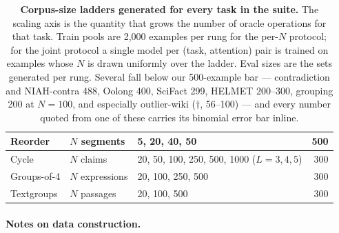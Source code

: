 \begin{table}[h]
\begin{tabular}{@{}l l l r@{}}
Reorder            & $N$ segments       & 5, 20, 40, 50                   & 500 \\
\midrule
Cycle              & $N$ claims         & 20, 50, 100, 250, 500, 1000 ($L{=}3,4,5$) & 300 \\
Groups-of-4        & $N$ expressions    & 20, 100, 250, 500               & 300 \\
Textgroups         & $N$ passages       & 20, 100, 500                    & 300 \\
\bottomrule
\end{tabular}
\caption{\textbf{Corpus-size ladders generated for every task in the suite.} The scaling axis is the
quantity that grows the number of oracle operations for that task. Train pools are 2{,}000 examples
per rung for the per-$N$ protocol; for the joint protocol a single model per (task, attention) pair
is trained on examples whose $N$ is drawn uniformly over the ladder. Eval sizes are the sets generated per rung.
Several fall below our 500-example bar --- contradiction and NIAH-contra 488, Oolong 400, SciFact 299,
HELMET 200--300, grouping 200 at $N{=}100$, and especially outlier-wiki ($\dagger$, 56--100) --- and
every number quoted from one of these carries its binomial error bar inline.}
\label{tab:ladders}
\end{table}

\paragraph{Notes on data construction.}


